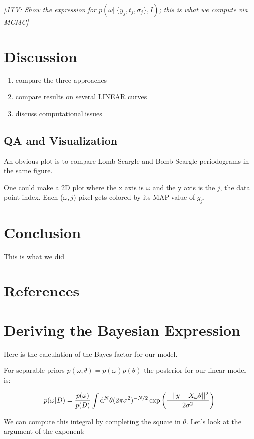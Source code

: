 \documentclass[12pt,pdftex]{article}
\newcommand{\jake}[1]{{\color{blue}\it[JTV: #1]}}
\begin{document}
\jake{Show the expression for $p(\omega|~\{y_j, t_j, \sigma_j\}, I)$; this is what we compute via MCMC}

\section{Discussion}
\begin{enumerate}
  \item compare the three approaches
  \item compare results on several LINEAR curves
  \item discuss computational issues  
\end{enumerate}
 

\subsection{QA and Visualization} 

An obvious plot is to compare Lomb-Scargle and Bomb-Scargle periodograms in the same figure. 

One could make a 2D plot where the x axis is $\omega$ and the y axis is the $j$, the data point index.
Each ($\omega, j$) pixel gets colored by its MAP value of $g_j$.


\section{Conclusion}
This is what we did

\section*{References}


\appendix
\section{Deriving the Bayesian Expression}
Here is the calculation of the Bayes factor for our model.

For separable priors $p(\omega,\theta) = p(\omega)p(\theta)$ the posterior for our linear model is:

\begin{equation}
  p(\omega|D) = \frac{p(\omega)}{p(D)}\int{\rm d}^N\theta(2\pi\sigma^2)^{-N/2}\exp\left(\frac{-||y - X_\omega\theta||^2}{2\sigma^2}\right)
\end{equation}

We can compute this integral by completing the square in $\theta$. Let's look at the argument of the exponent:
\end{document}
